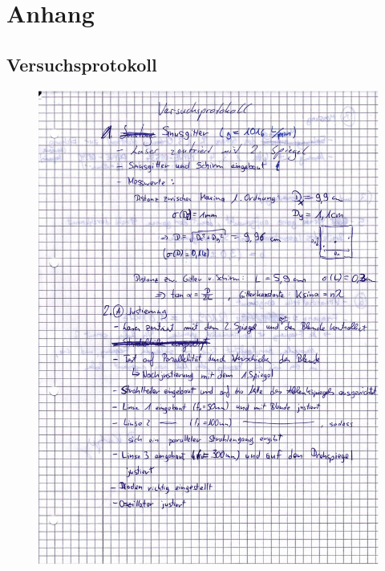 \clearpage
\section{Anhang}
\begin{appendix}

\section{Versuchsprotokoll}

\begin{figure}[H]
\centering \includegraphics[width=\textwidth]{Bilder/Protokoll1.jpg}
\end{figure}

\clearpage



\end{appendix}
